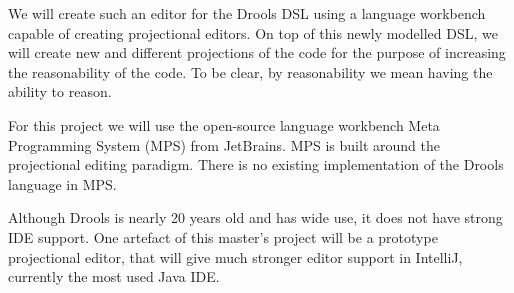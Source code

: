 We will create such an editor for the Drools DSL using a language workbench capable of creating projectional editors.  
On top of this newly modelled DSL, we will create new and different projections of the code for the purpose of increasing the reasonability of the code. 
To be clear, by reasonability we mean having the ability to reason.

For this project we will use the open-source language workbench Meta Programming System (MPS) from JetBrains\cite{MPS_ProductPage}.
MPS is built around the projectional editing paradigm.
There is no existing implementation of the Drools language in MPS.

Although Drools is nearly 20 years old and has wide use, it does not have strong IDE support.
One artefact of this master's project will be a prototype projectional editor, that will give much stronger editor support in IntelliJ, currently the most used Java IDE\cite{Java_usage_report}.
